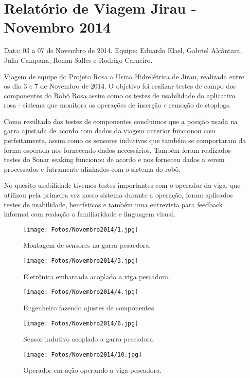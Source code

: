 \section{Relatório de Viagem Jirau - Novembro 2014}
Data: 03 a 07 de Novembro de 2014.
Equipe: Eduardo Elael, Gabriel Alcântara, Julia Campana, Renan Salles e Rodrigo Carneiro.


Viagem de equipe do Projeto Rosa a Usina Hidrelétrica de Jirau, realizada entre
os dia 3 e 7 de Novembro de 2014. O objetivo foi realizar testes de campo dos
componentes do Robô Rosa assim como os testes de usabilidade do aplicativo rosa
- sistema que monitora as operações de inserção e remoção de stoplogs.

Como resultado dos testes de componentes concluimos que a posição usada na
garra ajustada de acordo com dados da viagem anterior funcionou com
perfeitamente, assim como  os sensores indutivos que também se comportaram da
forma esperada nos fornecendo dados necessários.  Também foram realizados
testes do Sonar seaking funcionou de acordo e nos forneceu dados a serem
processados e futramente alinhados com o sistema do robô.

No quesito usabilidade tivemos testes importantes com o operador da viga, que
utilizou pela primeira vez nosso sistema durante a operação, foram aplicados
testes de usabilidade, heurísticos e também uma entrevista para feedback
informal com realação a familiaridade e linguagem visual.



\begin{figure}[h!]
\centering
  \texttt{[image: Fotos/Novembro2014/1.jpg]}
  \caption{Montagem de sensores na garra pesacdora.}
  \label{nov20131}
\end{figure}

\begin{figure}[h!]
  \centering
  \texttt{[image: Fotos/Novembro2014/3.jpg]}
  \caption{Eletrônica embarcada acoplada a viga pescadora.}
  \label{nov20132}
\end{figure}

\begin{figure}[h!]
  \centering
  \texttt{[image: Fotos/Novembro2014/4.jpg]}
  \caption{Engenheiro fazendo ajustes de componentes.}
  \label{nov20133}
\end{figure}

\begin{figure}[h!]
  \centering
  \texttt{[image: Fotos/Novembro2014/6.jpg]}
  \caption{Sensor indutivo acoplado a garra pescadora.}
  \label{nov20133}
\end{figure}

\begin{figure}[h!]
  \centering
  \texttt{[image: Fotos/Novembro2014/10.jpg]}
  \caption{Operador em ação operando a viga pescadora.}
  \label{nov20134}
\end{figure}